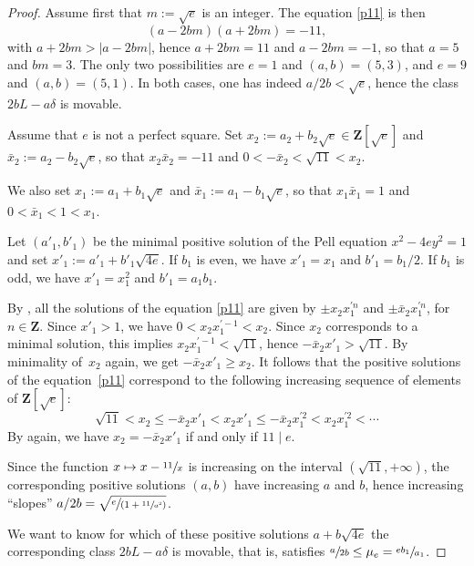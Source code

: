 \documentclass[11pt]{article}
\newcommand\mto{\mathchoice{\longmapsto}{\mapsto}{\mapsto}{\mapsto}}
\newcommand{\spfrac}[2]{\sfrac{#1}{(#2)}}
\theoremstyle{definition}
\newcommand\Z{{\mathbf Z}}
\let\Ld L
\begin{document}
\begin{proof}
Assume first that $m:=\sqrt{e}$ is an integer. The equation \eqref{p11} is then
\[
(a-2bm)(a+2bm)=-11,
\]
with $a+2bm>|a-2bm|$, hence
$a+2bm=11$ and $a-2bm=-1$, so that $a=5$ and $bm=3$. The only two possibilities are $e=1$ and $(a,b)=(5,3)$, and $e=9$ and $(a,b)=(5,1)$. In both cases, one has indeed $a/2b<\sqrt{e}$, hence the class
$2b\Ld-a\delta$ is movable.

Assume that $e$ is not a perfect square. Set
$x_2:=a_2+b_2\sqrt{e}\in\Z[\sqrt{e}]$ and $\bar x_2:=a_2-b_2\sqrt{e}$, so that $x_2\bar x_2= -11$ and $0<-\bar x_2< \sqrt{11}<x_2$.

We also set $x_1:=a_1+b_1\sqrt{e}$ and $\bar x_1:=a_1-b_1\sqrt{e}$, so that $x_1\bar x_1= 1$ and $0<\bar x_1< 1<x_1$.

Let $(a'_1,b'_1)$ be the minimal positive solution of the Pell equation $x^2-4ey^2=1$ and set $x'_1:=a'_1+b'_1\sqrt{4e}$. If $b_1$ is even, we have $x'_1=x_1$ and $b'_1=b_1/2$. If $b_1$ is odd, we have $x'_1=x_1^2$ and $b'_1=a_1b_1$.

By \cite[Th.\,110]{nage},
all the solutions of the equation \eqref{p11} are given by $\pm x_2x_1^{\prime n}$ and $\pm \bar x_2x_1^{\prime n}$, for $n\in \Z$. Since $x'_1>1$, we have $0<x_2x_1^{\prime -1}<x_2$. Since $x_2$ corresponds to a minimal solution, this implies $x_2x_1^{\prime -1}< \sqrt{11}$, hence $-\bar x_2x'_1>\sqrt{11}$. By minimality of~$x_2$ again, we get $-\bar x_2x'_1\ge x_2$. It follows that the positive solutions of the equation~\eqref{p11} correspond to the following increasing sequence of elements of $\Z[\sqrt{e}]$:
\begin{equation}\label{sols}
\sqrt{11}<x_2\le -\bar x_2x'_1<x_2x'_1\le -\bar x_2x_1^{\prime 2}<x_2x_1^{\prime 2}<\cdots
\end{equation}
By \cite[Th.\,110]{nage} again, we have $x_2= -\bar x_2x'_1$ if and only if $11\mid e$.

Since the function $x\mto x-\sfrac{11}{x}$ is increasing on the interval $(\sqrt{11},+\infty)$, the corresponding positive solutions $(a,b)$ have increasing $a$ and $b$, hence increasing ``slopes'' $a/2b=\sqrt{\spfrac{e}{ 1+\sfrac{11}{a^2}}}$.

We want to know for which of these positive solutions $a+b\sqrt{4e}$ the corresponding class $2b\Ld-a\delta$ is movable, that is, satisfies $\sfrac{a}{2b} \le \mu_e=\sfrac{eb_1}{a_1}$.


\end{proof}
\end{document}
